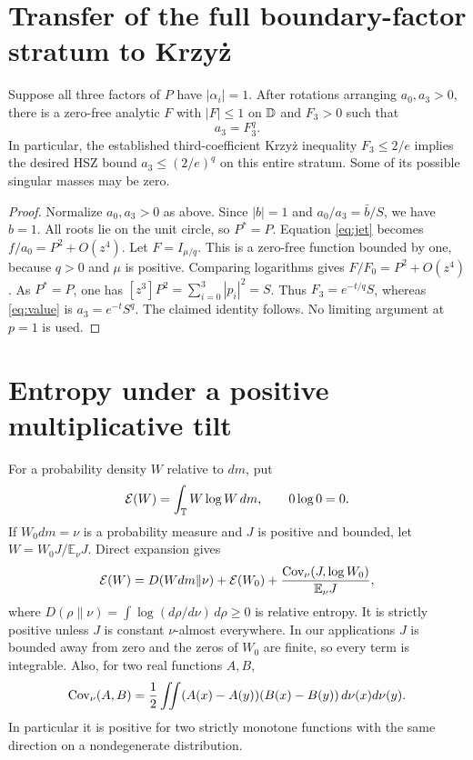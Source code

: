 \section{Transfer of the full boundary-factor stratum to Krzy\.{z}}
\begin{theorem}
Suppose all three factors of $P$ have $|\alpha_i|=1$.
After rotations arranging $a_0,a_3>0$, there is a zero-free analytic $F$ with $|F|\leq1$ on $\mathbb D$ and
$F_3>0$ such that
\[
 a_3=F_3^q.
\]
In particular, the established third-coefficient Krzy\.{z} inequality
$F_3\leq2/e$ implies the desired HSZ bound $a_3\leq(2/e)^q$
on this entire stratum. Some of its possible singular masses may be zero.
\end{theorem}
\begin{proof}
Normalize $a_0,a_3>0$ as above. Since $|b|=1$ and $a_0/a_3=\bar b/S$,
we have $b=1$. All roots lie on the unit circle, so $P^*=P$.
Equation \eqref{eq:jet} becomes $f/a_0=P^2+O(z^4)$.
Let $F=I_{\mu/q}$. This is a zero-free function bounded by one, because
$q>0$ and $\mu$ is positive. Comparing logarithms gives
$F/F_0=P^2+O(z^4)$.
As $P^*=P$, one has $[z^3]P^2=\sum_{i=0}^3|p_i|^2=S$.
Thus $F_3=e^{-t/q}S$, whereas \eqref{eq:value} is $a_3=e^{-t}S^q$.
The claimed identity follows. No limiting argument at $p=1$ is used.
\end{proof}


\section{Entropy under a positive multiplicative tilt}
For a probability density $W$ relative to $dm$, put
\[
 \mathcal E(W)=\int_{\mathbb T}W\log W\,dm,\qquad 0\log0=0.
\]
If $W_0dm=\nu$ is a probability measure and $J$ is positive and bounded,
let $W=W_0J/\mathbb E_\nu J$. Direct expansion gives
\begin{equation}\label{eq:tilt}
 \mathcal E(W)=D(Wdm\|\nu)+\mathcal E(W_0)
 +\frac{\operatorname{Cov}_\nu(J,\log W_0)}{\mathbb E_\nu J},
\end{equation}
where $D(\rho\|\nu)=\int\log(d\rho/d\nu)\,d\rho\ge0$ is relative entropy.
It is strictly positive unless $J$ is constant $\nu$-almost everywhere.
In our applications $J$ is bounded away from zero and the zeros of $W_0$
are finite, so every term is integrable. Also, for two real functions $A,B$,
\[
 \operatorname{Cov}_\nu(A,B)=\frac12\iint(A(x)-A(y))(B(x)-B(y))\,d\nu(x)d\nu(y).
\]
In particular it is positive for two strictly monotone functions with
the same direction on a nondegenerate distribution.
